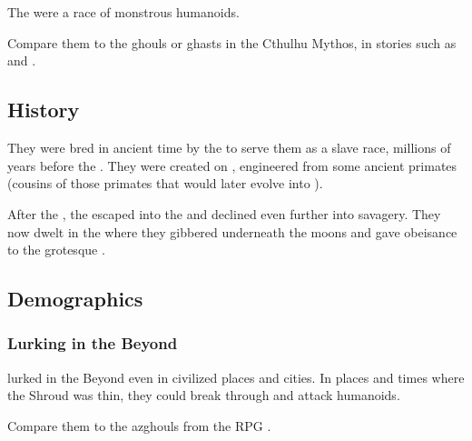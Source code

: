 \section{\Glithids}
\index{\glithid}
The \glithids were a race of monstrous humanoids. 

Compare them to the ghouls or ghasts in the Cthulhu Mythos, in stories such as \cite{HPLovecraft:PickmansModel} and \cite{HPLovecraft:TheDreamQuestofUnknownKadath}.









\subsection{History}
They were bred in ancient time by the  to serve them as a slave race, millions of years before the \banewars. 
They were created on \Miith, engineered from some ancient primates (cousins of those primates that would later evolve into \nephilim). 

After the , the \glithids escaped into the \wylde and declined even further into savagery.
They now dwelt in the \wylde where they gibbered underneath the moons and gave obeisance to the grotesque . 









\subsection{Demographics}





\subsubsection{Lurking in the Beyond}
\Glithids lurked in the Beyond even in civilized places and cities. 
In places and times where the Shroud was thin, they could break through and attack humanoids.

Compare them to the azghouls from the RPG \cite{RPG:Kult}. 









